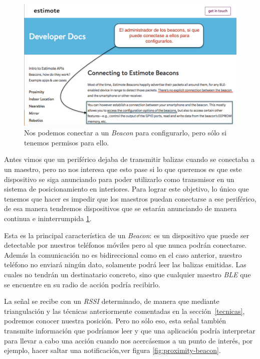 \begin{figure}[tbp]
\centering
\includegraphics[scale=0.4]{figures/estimote.png}
\caption{Nos podemos conectar a un \textit{Beacon} para configurarlo, pero sólo si tenemos permisos para ello.\label{fig:estimote}}
\end{figure}

Antes vimos que un periférico dejaba de transmitir balizas cuando se conectaba a un maestro, pero no nos interesa que esto pase si lo que queremos es que este dispositivo se siga anunciando para poder utilizarlo como transmisor en un sistema de posicionamiento en interiores. Para lograr este objetivo, lo único que tenemos que hacer es impedir que los maestros puedan conectarse a ese periférico, de esa manera tendremos dispositivos que se estarán anunciando de manera continua e ininterrumpida \ref{fig:estimote}.

Esta es la principal característica de un \textit{Beacon}: es un dispositivo que puede ser detectable por nuestros teléfonos móviles pero al que nunca podrán conectarse. Además la comunicación no es bidireccional como en el caso anterior, nuestro teléfono no enviará ningún dato, solamente podrá leer las balizas emitidas. Las cuales no tendrán un destinatario concreto, sino que cualquier maestro \textit{BLE} que se encuentre en su radio de acción podría recibirlo.

La señal se recibe con un \textit{RSSI} determinado, de manera que mediante triangulación y las técnicas anteriormente comentadas en la sección~\ref{tecnicas}, podremos conocer nuestra posición. Pero no sólo eso, esta señal también transmite información que podríamos leer y que una aplicación podría interpretar para llevar a cabo una acción cuando nos acercásemos a un punto de interés, por ejemplo, hacer saltar una notificación,ver figura \ref{fig:proximity-beacon}.

